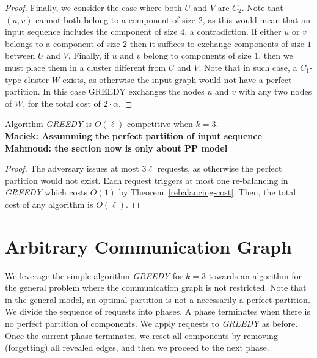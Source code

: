 \documentclass[manuscript,screen=true]{acmart}
\newcommand\mahmoud[1]{\color{green}\textbf{\\ Mahmoud: #1}\\\color{black}}
\newcommand\maciek[1]{\color{brown}\textbf{\\ Maciek: #1}\color{black}}
\begin{document}
\begin{appendix}
\begin{proof}
    Finally, we consider the case where both $U$ and $V$ are $C_2$. Note that $(u,v)$ cannot both belong to a component of size $2$, as this would mean that an input sequence includes the component of size $4$, a contradiction. 
    If either $u$ or $v$ belongs to a component of size $2$ then it suffices to exchange components of size $1$ between $U$ and $V$.
    Finally, if $u$ and $v$ belong to components of size $1$, then we must place them in a cluster different from $U$ and $V$.
    Note that in such case, a $C_1$-type cluster $W$ exists, as otherwise the input graph would not have a perfect partition. In this case GREEDY exchanges the nodes $u$ and $v$ with any two nodes of $W$, for the total cost of $2\cdot \alpha$.
  \end{proof}
  
    
  \begin{theorem}
    Algorithm \emph{GREEDY} is $O(\ell)$-competitive when $k=3$.
    \maciek{Assumming the perfect partition of input sequence
    \mahmoud{the section now is only about PP model}}
  \end{theorem}
  
  \begin{proof}
    The adversary issues at most $3\ell$ requests, as otherwise the perfect partition would not exist.
    Each request triggers at most one re-balancing in \emph{GREEDY}
    which costs $O(1)$ by Theorem~\ref{rebalancing-cost}.
    Then,
    the total cost of any algorithm is $O(\ell)$.
  \end{proof}
  
  \section{Arbitrary Communication Graph} \label{sec:generalModel}
  
  We leverage the simple algorithm \emph{GREEDY} for $k=3$
  towards an algorithm for the general problem
  where the communication graph is not restricted.
  Note that in the general model,
  an optimal partition is not a necessarily a perfect partition.
  We divide the sequence of requests into phases.
  A phase terminates when there is no perfect partition of components.
  We apply requests to \emph{GREEDY} as before. 
  Once the current phase terminates,
  we reset all components by removing (forgetting) all revealed edges,
  and then we proceed to the next phase.
  

\end{appendix}
\end{document}
